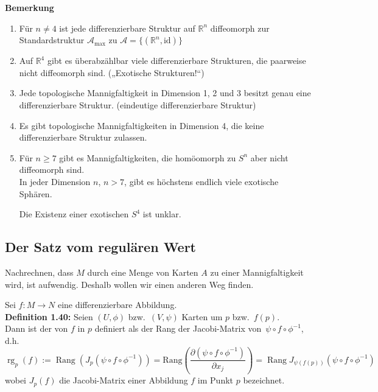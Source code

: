 \documentclass[fleqn, 12pt, letterpaper]{article}
\newcommand{\deldel}[2]{\frac{\partial #1}{\partial #2}}
\newcommand{\txt}[1]{\text{#1}}
\begin{document}
\textbf{Bemerkung}
\begin{enumerate}
  \item Für $n \neq 4$ ist jede differenzierbare Struktur auf $\mathbb{R}^n$ diffeomorph zur Standardstruktur $\mathcal{A}_{\text{max}}$ zu $\mathcal{A} = \{(\mathbb{R}^n, \text{id})\}$

  \item Auf $\mathbb{R}^4$ gibt es überabzählbar viele differenzierbare Strukturen, die paarweise nicht diffeomorph sind. („Exotische Strukturen!“)

  \item Jede topologische Mannigfaltigkeit in Dimension 1, 2 und 3 besitzt genau eine differenzierbare Struktur. (eindeutige differenzierbare Struktur)

  \item Es gibt topologische Mannigfaltigkeiten in Dimension 4, die keine differenzierbare Struktur zulassen.

  \item Für $n \geqslant  7$ gibt es Mannigfaltigkeiten, die homöomorph zu $S^n$ aber nicht diffeomorph sind.\\
  In jeder Dimension $n$, $n > 7$, gibt es höchstens endlich viele exotische Sphären.

  Die Existenz einer exotischen $S^4$ ist unklar.
\end{enumerate}


\subsection{Der Satz vom regulären Wert}

Nachrechnen, dass $M$ durch eine Menge von Karten $A$ zu einer Mannigfaltigkeit wird, ist aufwendig. Deshalb wollen wir einen anderen Weg finden.

Sei $f : M \to N$ eine differenzierbare Abbildung.\\

\textbf{Definition 1.40:} Seien $(U, \phi)$ bzw.\ $(V, \psi)$ Karten um $p$ bzw.\ $f(p)$.\\
Dann ist der  von $f$ in $p$ definiert als der Rang der Jacobi-Matrix von $\, \psi \circ f \circ \phi^{-1}$, d.h.
\[
\operatorname{rg}_p(f) := \operatorname{Rang} \left( J_p(\psi \circ f \circ \phi^{-1}) \right) = \txt{Rang}(\deldel{(\psi \circ f \circ \phi^{-1})}{x_j})
= \operatorname{Rang} J_{\psi(f(p))} \left( \psi \circ f \circ \phi^{-1} \right)
\]
wobei $J_p(f)$ die Jacobi-Matrix einer Abbildung $f$ im Punkt $p$ bezeichnet.\\
\end{document}
